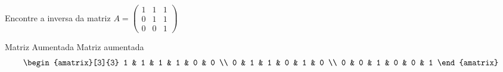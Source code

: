 \begin{question}
  Encontre a inversa da matriz
  \quad
  \(
    A =
    \begin{pmatrix}
      1 & 1 & 1 \\
      0 & 1 & 1 \\
      0 & 0 & 1
    \end{pmatrix}
  \)
\end{question}

\begin{resolution}{Matriz Aumentada}
  Matriz aumentada
  \[
    \begin{amatrix}[3]{3}
      1 & 1 & 1 & 1 & 0 & 0 \\
      0 & 1 & 1 & 0 & 1 & 0 \\
      0 & 0 & 1 & 0 & 0 & 1
    \end{amatrix}
  \]
\end{resolution}

